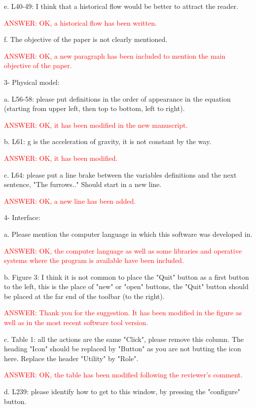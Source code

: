 \documentclass[a4paper]{article}
\begin{document}
e. L40-49: I think that a historical flow would be better to attract the reader.

\textcolor{red}{ANSWER: OK, a historical flow has been written.}

f. The objective of the paper is not clearly mentioned.

\textcolor{red}{ANSWER: OK, a new paragraph has been included to mention the
main objective of the paper.}

3- Physical model:

a. L56-58: please put definitions in the order of appearance in the equation (starting from upper left, then top to bottom, left to right).

\textcolor{red}{ANSWER: OK, it has been modified in the new manuscript.}

b. L61: g is the acceleration of gravity, it is not constant by the way.

\textcolor{red}{ANSWER: OK, it has been modified.}

c. L64: please put a line brake between the variables definitions and the next sentence, "The furrows.." Should start in a new line.

\textcolor{red}{ANSWER: OK, a new line has been added.}

4- Interface:

a. Please mention the computer language in which this software was developed in.

\textcolor{red}{ANSWER: OK, the computer language as well as some libraries and
operative systems where the program is available have been included.}

b. Figure 3: I think it is not common to place the "Quit" button as a first button to the left, this is the place of "new" or "open" buttons, the "Quit" button should be placed at the far end of the toolbar (to the right).

\textcolor{red}{ANSWER: Thank you for the suggestion. It has been modified in
the figure as well as in the most recent software tool version.}

c. Table 1: all the actions are the same "Click", please remove this column. The heading "Icon" should be replaced by "Button" as you are not butting the icon here. Replace the header "Utility" by "Role".

\textcolor{red}{ANSWER: OK, the table has been modified following the reviewer's
comment.}

d. L239: please identify how to get to this window, by pressing the "configure" button.
\end{document}

